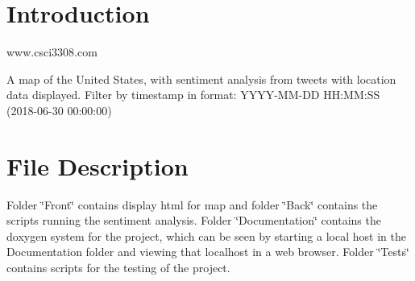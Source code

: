 \hypertarget{index_Introduction}{}\section{Introduction}\label{index_Introduction}
www.\+csci3308.\+com

A map of the United States, with sentiment analysis from tweets with location data displayed. Filter by timestamp in format\+: Y\+Y\+Y\+Y-\/\+M\+M-\/\+DD H\+H\+:\+MM\+:SS (2018-\/06-\/30 00\+:00\+:00)\hypertarget{index_file_sec}{}\section{File Description}\label{index_file_sec}
Folder \char`\"{}\+Front\char`\"{} contains display html for map and folder \char`\"{}\+Back\char`\"{} contains the scripts running the sentiment analysis. Folder \char`\"{}\+Documentation\char`\"{} contains the doxygen system for the project, which can be seen by starting a local host in the Documentation folder and viewing that localhost in a web browser. Folder \char`\"{}\+Tests\char`\"{} contains scripts for the testing of the project. 